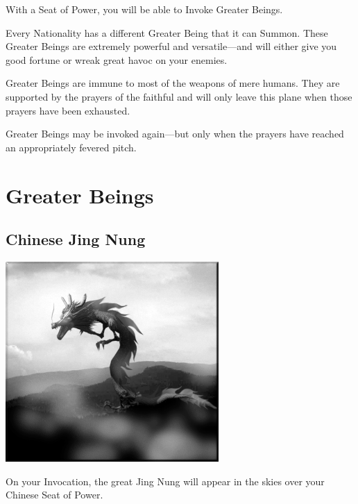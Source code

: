 With a Seat of Power, you will be able to Invoke Greater Beings.

Every Nationality has a different Greater Being that it can Summon. These Greater Beings are extremely powerful and versatile---and will either give you good fortune or wreak great havoc on your enemies.

Greater Beings are immune to most of the weapons of mere humans. They are supported by the prayers of the faithful and will only leave this plane when those prayers have been exhausted.

Greater Beings may be invoked again---but only when the prayers have reached an appropriately fevered pitch.

\clearpage

\section{Greater Beings}

\subsection{Chinese Jing Nung}

\begin{center}
	\includegraphics[width=1\linewidth]{Ajingnung}
\end{center}

On your Invocation, the great Jing Nung will appear in the skies over your Chinese Seat of Power.

